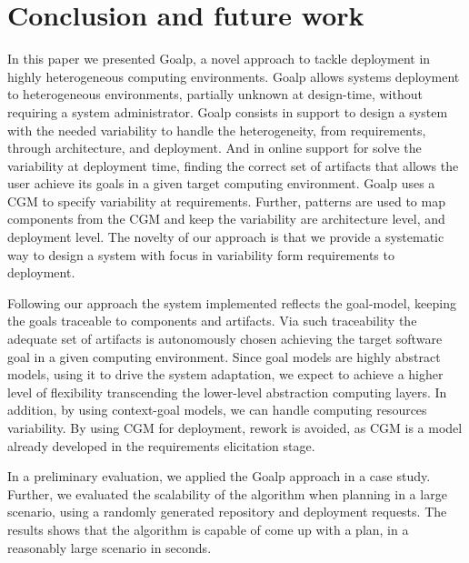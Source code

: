 \section{Conclusion and future work}
\label{sec:conclusion}

In this paper we presented Goalp, a novel approach to tackle deployment in highly heterogeneous computing environments.
Goalp allows systems deployment to heterogeneous environments, partially unknown at design-time, without requiring a system administrator.
Goalp consists in support to design a system with the needed variability to handle the heterogeneity, from requirements, through architecture, and deployment.
And in online support for solve the variability at deployment time, finding the correct set of artifacts that allows the user achieve its goals in a given target computing environment. Goalp uses a CGM to specify variability at requirements. Further, patterns are used to map components from the CGM and keep the variability are architecture level, and deployment level. The novelty of our approach is that we provide a systematic way to design a system with focus in variability form requirements to deployment.

Following our approach the system implemented reflects the goal-model, keeping the goals traceable to components and artifacts. Via such traceability the adequate set of artifacts is autonomously chosen achieving the target software goal in a given computing environment. Since goal models are highly abstract models, using it to drive the system adaptation, we expect to achieve a higher level of flexibility transcending the lower-level abstraction computing layers. In addition, by using context-goal models, we can handle computing resources variability. By using CGM for deployment, rework is avoided, as CGM is a model already developed in the requirements elicitation stage.

In a preliminary evaluation, we applied the Goalp approach in a case study. Further, we evaluated the scalability of the algorithm when planning in a large scenario, using a randomly generated repository and deployment requests. The results shows that the algorithm is capable of come up with a plan, in a reasonably large scenario in seconds.

